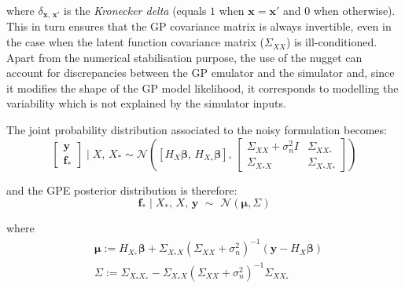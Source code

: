\noindent
where $\delta_{\mathbf{x},\,\mathbf{x}'}$ is the \textit{Kronecker delta} (equals $1$ when $\mathbf{x} = \mathbf{x}'$ and $0$ when otherwise). This in turn ensures that the GP covariance matrix is always invertible, even in the case when the latent function covariance matrix ($\Sigma_{XX}$) is ill-conditioned. Apart from the numerical stabilisation purpose, the use of the nugget can account for discrepancies between the GP emulator and the simulator and, since it modifies the shape of the GP model likelihood, it corresponds to modelling the variability which is not explained by the simulator inputs.

\vspace{0.2cm}
The joint probability distribution associated to the noisy formulation becomes:
%
\begin{equation}
    \begin{bmatrix}
    \mathbf{y} \\ \mathbf{f}_{*}
    \end{bmatrix}\;\vert\; X,\,X_{*} \sim \mathcal{N}\left([H_{X}\boldsymbol{\beta},\,H_{X_{*}}\boldsymbol{\beta}],\,\begin{bmatrix}
    \Sigma_{XX}+\sigma_n^2 I & \Sigma_{XX_{*}} \\
    \Sigma_{X_{*}X} & \Sigma_{X_{*}X_{*}}
    \end{bmatrix}
    \right)
\end{equation}

\noindent
and the GPE posterior distribution is therefore:
%
\begin{equation}\label{eq:gpepostdistr}
    \mathbf{f}_{*}\;\vert\; X_{*},\,X,\,\mathbf{y}\,\,\sim\,\,\mathcal{N}(\boldsymbol{\mu},\Sigma)
\end{equation}
    
\noindent
where
%
\begin{align}
    &\boldsymbol{\mu} := H_{X_{*}}\boldsymbol{\beta} + \Sigma_{X_{*}X}(\Sigma_{XX}+\sigma_n^2)^{-1}(\mathbf{y} - H_{X}\boldsymbol{\beta}) \\
    &\Sigma := \Sigma_{X_{*}X_{*}}-\Sigma_{X_{*}X}(\Sigma_{XX}+\sigma_n^2)^{-1}\Sigma_{XX_{*}}
\end{align}

